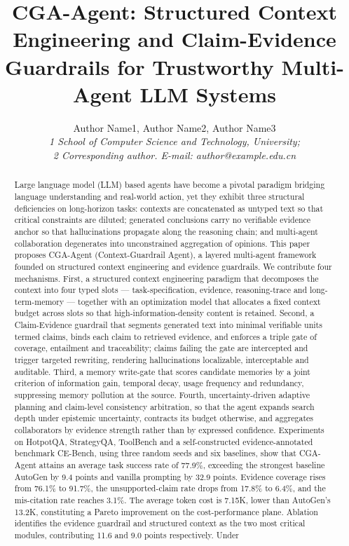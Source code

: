 \documentclass[journal,10pt,a4paper]{IEEEtran}
\begin{document}
\title{CGA-Agent: Structured Context Engineering and Claim-Evidence Guardrails for Trustworthy Multi-Agent LLM Systems}

\author{Author Name1, Author Name2, Author Name3\\
\textit{1 School of Computer Science and Technology, University;}\\
\textit{2 Corresponding author. E-mail: author@example.edu.cn}}

\maketitle

\begin{abstract}
Large language model (LLM) based agents have become a pivotal paradigm bridging language understanding and real-world action, yet they exhibit three structural deficiencies on long-horizon tasks: contexts are concatenated as untyped text so that critical constraints are diluted; generated conclusions carry no verifiable evidence anchor so that hallucinations propagate along the reasoning chain; and multi-agent collaboration degenerates into unconstrained aggregation of opinions. This paper proposes CGA-Agent (Context-Guardrail Agent), a layered multi-agent framework founded on structured context engineering and evidence guardrails. We contribute four mechanisms. First, a structured context engineering paradigm that decomposes the context into four typed slots --- task-specification, evidence, reasoning-trace and long-term-memory --- together with an optimization model that allocates a fixed context budget across slots so that high-information-density content is retained. Second, a Claim-Evidence guardrail that segments generated text into minimal verifiable units termed claims, binds each claim to retrieved evidence, and enforces a triple gate of coverage, entailment and traceability; claims failing the gate are intercepted and trigger targeted rewriting, rendering hallucinations localizable, interceptable and auditable. Third, a memory write-gate that scores candidate memories by a joint criterion of information gain, temporal decay, usage frequency and redundancy, suppressing memory pollution at the source. Fourth, uncertainty-driven adaptive planning and claim-level consistency arbitration, so that the agent expands search depth under epistemic uncertainty, contracts its budget otherwise, and aggregates collaborators by evidence strength rather than by expressed confidence. Experiments on HotpotQA, StrategyQA, ToolBench and a self-constructed evidence-annotated benchmark CE-Bench, using three random seeds and six baselines, show that CGA-Agent attains an average task success rate of 77.9\%, exceeding the strongest baseline AutoGen by 9.4 points and vanilla prompting by 32.9 points. Evidence coverage rises from 76.1\% to 91.7\%, the unsupported-claim rate drops from 17.8\% to 6.4\%, and the mis-citation rate reaches 3.1\%. The average token cost is 7.15K, lower than AutoGen's 13.2K, constituting a Pareto improvement on the cost-performance plane. Ablation identifies the evidence guardrail and structured context as the two most critical modules, contributing 11.6 and 9.0 points respectively. Under 
\end{abstract}
\end{document}
